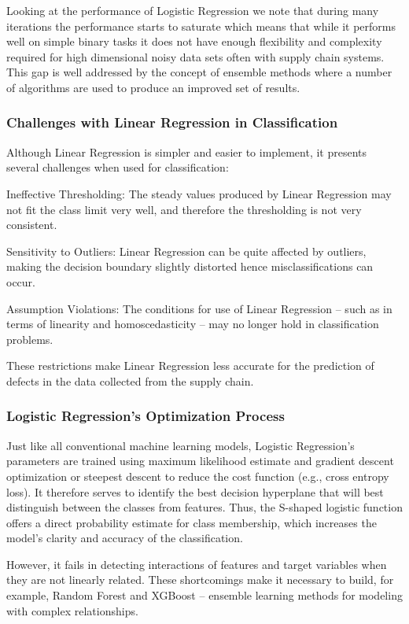 \documentclass[conference]{IEEEtran}
\begin{document}
Looking at the performance of Logistic Regression we note that during many iterations the performance starts to saturate which means that while it performs well on simple binary tasks it does not have enough flexibility and complexity required for high dimensional noisy data sets often with supply chain systems. This gap is well addressed by the concept of ensemble methods where a number of algorithms are used to produce an improved set of results.

\subsubsection{Challenges with Linear Regression in Classification}

Although Linear Regression is simpler and easier to implement, it presents several challenges when used for classification:

Ineffective Thresholding: The steady values produced by Linear Regression may not fit the class limit very well, and therefore the thresholding is not very consistent.

Sensitivity to Outliers: Linear Regression can be quite affected by outliers, making the decision boundary slightly distorted hence misclassifications can occur.

Assumption Violations: The conditions for use of Linear Regression – such as in terms of linearity and homoscedasticity – may no longer hold in classification problems.

These restrictions make Linear Regression less accurate for the prediction of defects in the data collected from the supply chain.

\subsubsection{Logistic Regression's Optimization Process}

Just like all conventional machine learning models, Logistic Regression’s parameters are trained using maximum likelihood estimate and gradient descent optimization or steepest descent to reduce the cost function (e.g., cross entropy loss). It therefore serves to identify the best decision hyperplane that will best distinguish between the classes from features. Thus, the S-shaped logistic function offers a direct probability estimate for class membership, which increases the model’s clarity and accuracy of the classification.

However, it fails in detecting interactions of features and target variables when they are not linearly related. These shortcomings make it necessary to build, for example, Random Forest and XGBoost – ensemble learning methods for modeling with complex relationships.
\end{document}
